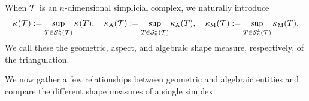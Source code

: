 \documentclass[10pt,a4paper]{article}
\begin{document}
When ${\mathcal T}$ is an $n$-dimensional simplicial complex, we naturally introduce 
\begin{align}\label{math:shapemeasure:triangulation}
    \kappa_{}({\mathcal T}) := \sup_{ T \in {\mathcal S}^{\downarrow}_{n}({\mathcal T}) } \kappa_{}(T)
    ,
    \quad 
    \kappa_{\rm A}({\mathcal T}) := \sup_{ T \in {\mathcal S}^{\downarrow}_{n}({\mathcal T}) } \kappa_{\rm A}(T)
    ,
    \quad 
    \kappa_{\rm M}({\mathcal T}) := \sup_{ T \in {\mathcal S}^{\downarrow}_{n}({\mathcal T}) } \kappa_{\rm M}(T)
    .
\end{align}
We call these the geometric, aspect, and algebraic shape measure, respectively, of the triangulation. 

We now gather a few relationships between geometric and algebraic entities and compare the different shape measures of a single simplex.
\end{document}
